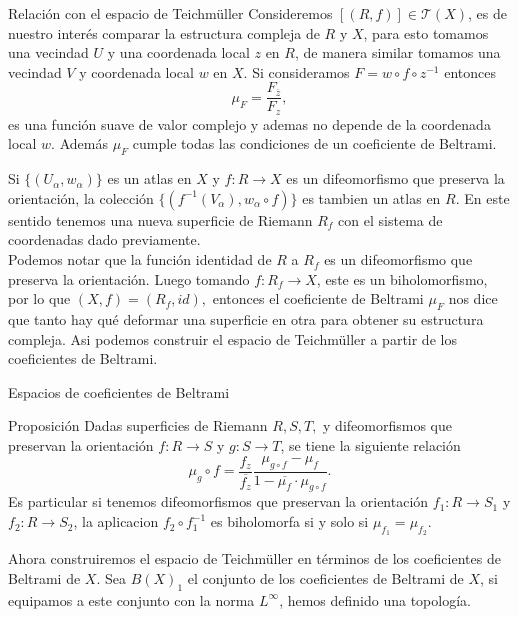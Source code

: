 \documentclass[xcolor=dvipsnames,10pt]{beamer}
\begin{document}
\begin{frame}{Relación con el espacio de Teichmüller}
    Consideremos $[(R,f)]\in\mathcal{T}(X)$, es de nuestro interés comparar la estructura compleja de $R$ y $X$, para esto tomamos una vecindad $U$ y una coordenada local $z$ en $R$, de manera similar tomamos una vecindad $V$ y  coordenada local $w$ en $X.$ Si consideramos $F=w\circ f\circ z^{-1}$ entonces 
    $$\mu_F=\frac{F_{\overline{z}}}{F_z},$$
    es una función suave de valor complejo y ademas no depende de la coordenada local $w.$ Además $\mu_F$ cumple todas las condiciones de un coeficiente de Beltrami.
\end{frame}
\begin{frame}
    Si $\{(U_\alpha,w_\alpha)\}$ es un atlas en $X$ y $f:R\rightarrow X$ es un difeomorfismo que preserva la orientación, la colección $\{(f^{-1}(V_\alpha),w_\alpha \circ f)\}$ es tambien un atlas en $R$. En este sentido tenemos una nueva superficie de Riemann $R_f$ con el sistema de coordenadas dado previamente.\\
    \vspace{0.3cm}
    Podemos notar que la función identidad de $R$ a $R_f$ es un difeomorfismo que preserva la orientación. Luego tomando $f:R_f\to X$, este es un biholomorfismo, por lo que $(X,f)=(R_f,id),$ entonces el coeficiente de Beltrami $\mu_F$ nos dice que tanto hay qué deformar una superficie en otra para obtener su estructura compleja. Asi podemos construir el espacio de Teichmüller a partir de los coeficientes de Beltrami.
\end{frame}
\begin{frame}{Espacios de coeficientes de Beltrami}

    \begin{block}{Proposición}
        Dadas superficies de Riemann $R,S,T,$ y difeomorfismos que preservan la orientación $f:R\to S$ y $g:S\to T$, se tiene la siguiente relación
        $$\mu_g\circ f=\frac{f_z}{\overline{f_z}}\frac{\mu_{g\circ f}-\mu_f}{1-\overline{\mu_f}\cdot\mu_{g\circ f}}.$$ 
        Es particular si tenemos difeomorfismos que preservan la orientación $f_1:R\to S_1$ y $f_2:R\to S_2$, la aplicacion $f_2\circ f_1^{-1}$ es biholomorfa si y solo si $\mu_{f_1}=\mu_{f_2}.$
    \end{block}
    Ahora construiremos el espacio de Teichmüller en términos de los coeficientes de Beltrami de $X.$ Sea $B(X)_1$ el conjunto de los coeficientes de Beltrami de $X$, si equipamos a este conjunto con la norma $L^\infty$, hemos definido una topología. 
\end{frame}
\end{document}
